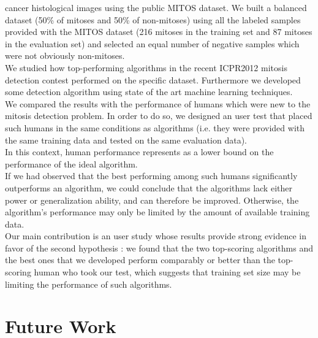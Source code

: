 cancer histological images using the public MITOS dataset. 
We built a balanced dataset (50\% of mitoses and 50\% of non-mitoses) using all the labeled samples provided with the MITOS dataset (216 mitoses in the training set and 87 mitoses in
the evaluation set) and selected an equal number of negative samples which were not obviously non-mitoses.\\
We studied how top-performing algorithms in the recent ICPR2012 mitosis detection contest performed on the specific dataset. Furthermore 
we developed some detection algorithm using state of the art machine learning techniques.\\
We compared the results with the performance of humans which were new to the mitosis detection problem.
In order to do so, we designed an user test that placed such humans in the same conditions
as algorithms (i.e. they were provided with the same training data and tested
on the same evaluation data).\\
In this context, human performance represents as a lower bound on the performance of the ideal algorithm.\\
If we had observed that the best performing among such humans significantly outperforms an algorithm, we could
conclude that the algorithms lack either power or generalization ability, and
can therefore be improved. Otherwise, the algorithm's performance may only be
limited by the amount of available training data.\\
Our main contribution is an user study whose results provide strong evidence in favor of the second hypothesis : we found that the two top-scoring algorithms
and the best ones that we developed perform comparably or better than the top-scoring human who took our test, which suggests that training set size may be limiting
the performance of such algorithms.

\vspace{0.5cm}

\section{Future Work}

